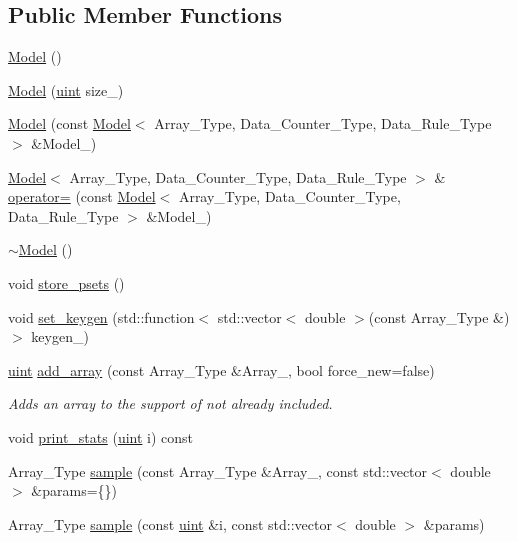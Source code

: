 \subsection*{Public Member Functions}
\begin{DoxyCompactItemize}
\item 
\hyperlink{classbarry_1_1_model_a29e6e0c37d9a892772c5ee95ce1e1043}{Model} ()
\item 
\hyperlink{classbarry_1_1_model_a46639bb435ca2992dac8858528a5362e}{Model} (\hyperlink{namespacebarry_a11dfc53ddb4672278319aa04f1e09a6c}{uint} size\+\_\+)
\item 
\hyperlink{classbarry_1_1_model_a047905a921baa9e51a4f07d337379375}{Model} (const \hyperlink{classbarry_1_1_model}{Model}$<$ Array\+\_\+\+Type, Data\+\_\+\+Counter\+\_\+\+Type, Data\+\_\+\+Rule\+\_\+\+Type $>$ \&Model\+\_\+)
\item 
\hyperlink{classbarry_1_1_model}{Model}$<$ Array\+\_\+\+Type, Data\+\_\+\+Counter\+\_\+\+Type, Data\+\_\+\+Rule\+\_\+\+Type $>$ \& \hyperlink{classbarry_1_1_model_a4944b5918dc4a9a59f72587da1e6bb3a}{operator=} (const \hyperlink{classbarry_1_1_model}{Model}$<$ Array\+\_\+\+Type, Data\+\_\+\+Counter\+\_\+\+Type, Data\+\_\+\+Rule\+\_\+\+Type $>$ \&Model\+\_\+)
\item 
\hyperlink{classbarry_1_1_model_a2b8617c8bb1b8c76bbaa0f596af0c132}{$\sim$\+Model} ()
\item 
void \hyperlink{classbarry_1_1_model_a06a6f52dfc6868908cf11e6663a93904}{store\+\_\+psets} ()
\item 
void \hyperlink{classbarry_1_1_model_add1847cdaf3f5bbde6c14efc2e4d16df}{set\+\_\+keygen} (std\+::function$<$ std\+::vector$<$ double $>$(const Array\+\_\+\+Type \&)$>$ keygen\+\_\+)
\item 
\hyperlink{namespacebarry_a11dfc53ddb4672278319aa04f1e09a6c}{uint} \hyperlink{classbarry_1_1_model_a17a2205b52c03bb29eefb8fb126a01f6}{add\+\_\+array} (const Array\+\_\+\+Type \&Array\+\_\+, bool force\+\_\+new=false)
\begin{DoxyCompactList}\small\item\em Adds an array to the support of not already included. \end{DoxyCompactList}\item 
void \hyperlink{classbarry_1_1_model_ac00b5c6a1446ad00fdf1d92c9cb1df3c}{print\+\_\+stats} (\hyperlink{namespacebarry_a11dfc53ddb4672278319aa04f1e09a6c}{uint} i) const
\item 
Array\+\_\+\+Type \hyperlink{classbarry_1_1_model_a1b7b9ad1362b8de49c00e7e8d5d3675e}{sample} (const Array\+\_\+\+Type \&Array\+\_\+, const std\+::vector$<$ double $>$ \&params=\{\})
\item 
Array\+\_\+\+Type \hyperlink{classbarry_1_1_model_a7fb66a67707f610b70ee05b814373f49}{sample} (const \hyperlink{namespacebarry_a11dfc53ddb4672278319aa04f1e09a6c}{uint} \&i, const std\+::vector$<$ double $>$ \&params)
\end{DoxyCompactItemize}
